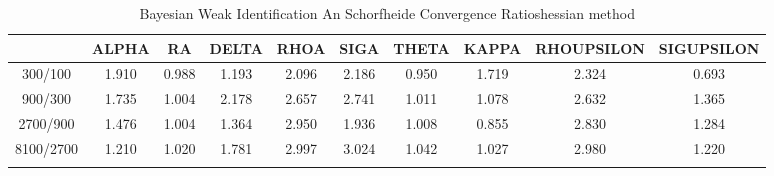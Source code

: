 \documentclass[a4paper,10pt]{article}
\begin{document}
\centering
\begin{longtable}{cccccccccc}
\toprule
 & ALPHA & RA & DELTA & RHOA & SIGA & THETA & KAPPA & RHOUPSILON & SIGUPSILON \\
\midrule
300/100 & 1.910 & 0.988 & 1.193 & 2.096 & 2.186 & 0.950 & 1.719 & 2.324 & 0.693 \\
900/300 & 1.735 & 1.004 & 2.178 & 2.657 & 2.741 & 1.011 & 1.078 & 2.632 & 1.365 \\
2700/900 & 1.476 & 1.004 & 1.364 & 2.950 & 1.936 & 1.008 & 0.855 & 2.830 & 1.284 \\
8100/2700 & 1.210 & 1.020 & 1.781 & 2.997 & 3.024 & 1.042 & 1.027 & 2.980 & 1.220 \\
\bottomrule
\caption{Bayesian Weak Identification An Schorfheide Convergence Ratioshessian method}
\label{table:tbl:WeakAnSchoConvergenceRatios_hessian}
\end{longtable}
\end{document}
